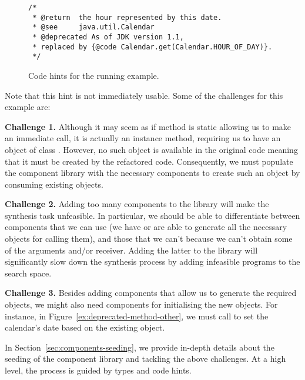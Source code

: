 \documentclass[sigconf,review,anonymous]{acmart}
\begin{document}
\begin{figure}
\begin{lstlisting}[mathescape=true,showstringspaces=false]
/*
 * @return  the hour represented by this date.
 * @see     java.util.Calendar
 * @deprecated As of JDK version 1.1,
 * replaced by {@code Calendar.get(Calendar.HOUR_OF_DAY)}.
 */  
\end{lstlisting}
\caption{Code hints for the running example.}
\label{ex:code-hints}
\end{figure}


Note that this hint is not immediately usable. Some of the challenges
for this example are:

{\bf Challenge 1.}  Although it may seem as if
method  is static allowing us to make an immediate call,
it is actually an instance method, requiring us to have an object of
class . However, no such object is available in the
original code meaning that it must be created by the refactored code.
Consequently, we must populate the component library with the necessary
components to create such an object by consuming existing objects.

{\bf Challenge 2.} Adding too many components to the library will
make the synthesis task unfeasible. In particular, we should
be able to differentiate between components that we can use
(we have or are able to generate
all the necessary objects for calling them), and those
that we can't because we can't obtain some of the arguments
and/or receiver. Adding the latter to the library will
significantly slow down the synthesis process by
adding infeasible programs to the search space.

{\bf Challenge 3.} Besides adding components that allow
us to generate the required objects, we might also need
components for initialising the new objects. For instance,
in Figure~\ref{ex:deprecated-method-other}, we must call
 to set the calendar's date
based on the existing  object.

In Section~\ref{sec:components-seeding}, we provide in-depth details about the
seeding of the component library and tackling the above challenges. 
At a high level, the process is guided by types and code hints.
\end{document}
